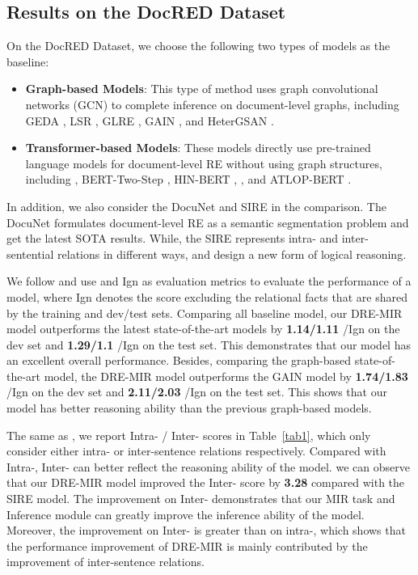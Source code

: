 \documentclass{article}
\begin{document}
\begin{table*}[th]
\subsection{Results on the DocRED Dataset}
On the DocRED Dataset, we choose the following two types of models as the baseline:
\begin{itemize}
    \item \textbf{Graph-based Models}: This type of method uses graph convolutional networks (GCN) \cite{c:18,c:34,c:35}  to complete inference on document-level graphs, including GEDA \cite{c:36}, LSR \cite{c:14}, GLRE \cite{c:16}, GAIN \cite{c:10}, and HeterGSAN \cite{c:37}.
    
    \item \textbf{Transformer-based Models}: These models directly use pre-trained language models for document-level RE without using graph structures, including  \cite{c:37}, BERT-Two-Step \cite{c:38}, HIN-BERT \cite{c:19},  \cite{c:39}, and ATLOP-BERT \cite{c:11}.
\end{itemize}
In addition, we also consider the DocuNet \cite{c:13} and SIRE \cite{c:42} in the comparison. 
The DocuNet formulates document-level RE as a semantic segmentation problem and get the latest SOTA results. 
While, the SIRE represents intra- and inter-sentential relations in different ways, and design a new form of logical reasoning.


We follow \cite{c:8} and use  and Ign as evaluation metrics to evaluate the performance of a model, where Ign denotes the  score excluding the relational facts that are shared by the training and dev/test sets. 
Comparing all baseline model, our DRE-MIR model outperforms the latest state-of-the-art models by \textbf{1.14/1.11} /Ign on the dev set and \textbf{1.29/1.1} /Ign on the test set. This demonstrates that our model has an excellent overall performance. 
Besides, comparing the graph-based state-of-the-art model, the  DRE-MIR model outperforms the GAIN model by \textbf{1.74/1.83} /Ign on the dev set and \textbf{2.11/2.03} /Ign on the test set. 
This shows that our model has better reasoning ability than the previous graph-based models.

The same as \cite{c:14,c:37} , we report Intra- / Inter- scores in Table~\ref{tab1}, which only consider either intra- or inter-sentence relations respectively. 
Compared with Intra-, Inter- can better reflect the reasoning ability of the model.
we can observe that our DRE-MIR model improved the Inter- score by \textbf{3.28} compared with the SIRE model.
The improvement on Inter- demonstrates that our MIR task and Inference module can greatly improve the inference ability of the model.
Moreover, the improvement on Inter- is greater than on intra-, which shows that the performance improvement of DRE-MIR is mainly contributed by the improvement of inter-sentence relations.



\end{table*}
\end{document}
